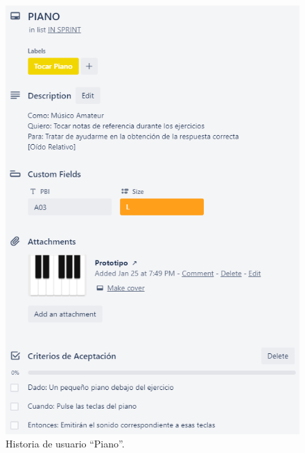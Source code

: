 \documentclass[12pt,twoside,titlepage]{report}
\begin{document}
\begin{figure}[H]
    \centering
    \includegraphics[scale=1.3]{Scrum/User Stories/Piano}
    \caption{Historia de usuario ``Piano''.}
    \label{fig:Piano}
\end{figure}
\end{document}
